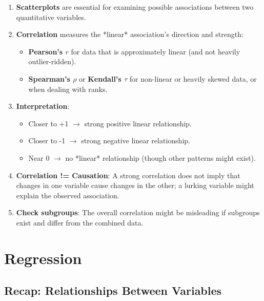 \documentclass[10pt, total={6in, 8in}]{extarticle}
\begin{document}
\begin{takeaway-box}{}{}
\begin{enumerate}
    \item \textbf{Scatterplots} are essential for examining possible associations between two quantitative variables.
    \item \textbf{Correlation} measures the *linear* association's direction and strength:
          \begin{itemize}
              \item \textbf{Pearson's $r$} for data that is approximately linear (and not heavily outlier-ridden).
              \item \textbf{Spearman's $\rho$} or \textbf{Kendall's $\tau$} for non-linear or heavily skewed data, or when dealing with ranks.
          \end{itemize}
    \item \textbf{Interpretation}:
          \begin{itemize}
              \item Closer to +1 $\rightarrow$ strong positive linear relationship.
              \item Closer to -1 $\rightarrow$ strong negative linear relationship.
              \item Near 0 $\rightarrow$ no *linear* relationship (though other patterns might exist).
          \end{itemize}
    \item \textbf{Correlation != Causation}: A strong correlation does not imply that changes in one variable cause changes in the other; a lurking variable might explain the observed association.
    \item \textbf{Check subgroups}: The overall correlation might be misleading if subgroups exist and differ from the combined data.
\end{enumerate}
\end{takeaway-box}

\section{Regression}
\subsection{Recap: Relationships Between Variables}
\end{document}
